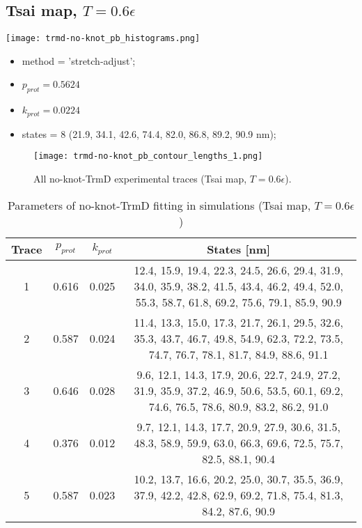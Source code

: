 \subsection{Tsai map, $T=0.6\epsilon$}
\label{subsec:no-knot-trmd-pb}
\begin{minipage}[c]{0.7\textwidth}
    \texttt{[image: trmd-no-knot\_pb\_histograms.png]}
\end{minipage}
\hfill
\begin{minipage}[c]{0.45\textwidth}
    \begin{itemize}
        \item method = 'stretch-adjust';
        \item $p_{prot}=0.5624$
        \item $k_{prot}=0.0224$
        \item states = 8 (21.9, 34.1, 42.6, 74.4, 82.0, 86.8, 89.2, 90.9 nm);
    \end{itemize}
\end{minipage}

\begin{figure}
    \centering
    \texttt{[image: trmd-no-knot\_pb\_contour\_lengths\_1.png]}
    \caption{All no-knot-TrmD experimental traces (Tsai map, $T=0.6\epsilon$).}
    \label{fig:no-knot-trmd-pb-cl1}
\end{figure}

\begin{table}
    \tiny
    \centering
    \caption{Parameters of no-knot-TrmD fitting in simulations (Tsai map, $T=0.6\epsilon$)}
    \label{tab:no-knot-trmd-pb-parameters}
    \begin{tabular}{c|c|c|c}
        \textbf{Trace} & \textbf{$p_{prot}$} & \textbf{$k_{prot}$} & \textbf{States [nm]}\\\hline
        1 & 0.616 & 0.025 & 12.4, 15.9, 19.4, 22.3, 24.5, 26.6, 29.4, 31.9, 34.0, 35.9, 38.2, 41.5, 43.4, 46.2, 49.4, 52.0, 55.3, 58.7, 61.8, 69.2, 75.6, 79.1, 85.9, 90.9\\
        2 & 0.587 & 0.024 & 11.4, 13.3, 15.0, 17.3, 21.7, 26.1, 29.5, 32.6, 35.3, 43.7, 46.7, 49.8, 54.9, 62.3, 72.2, 73.5, 74.7, 76.7, 78.1, 81.7, 84.9, 88.6, 91.1\\
        3 & 0.646 & 0.028 & 9.6, 12.1, 14.3, 17.9, 20.6, 22.7, 24.9, 27.2, 31.9, 35.9, 37.2, 46.9, 50.6, 53.5, 60.1, 69.2, 74.6, 76.5, 78.6, 80.9, 83.2, 86.2, 91.0\\
        4 & 0.376 & 0.012 & 9.7, 12.1, 14.3, 17.7, 20.9, 27.9, 30.6, 31.5, 48.3, 58.9, 59.9, 63.0, 66.3, 69.6, 72.5, 75.7, 82.5, 88.1, 90.4\\
        5 & 0.587 & 0.023 & 10.2, 13.7, 16.6, 20.2, 25.0, 30.7, 35.5, 36.9, 37.9, 42.2, 42.8, 62.9, 69.2, 71.8, 75.4, 81.3, 84.2, 87.6, 90.9\\
    \end{tabular}
\end{table}

